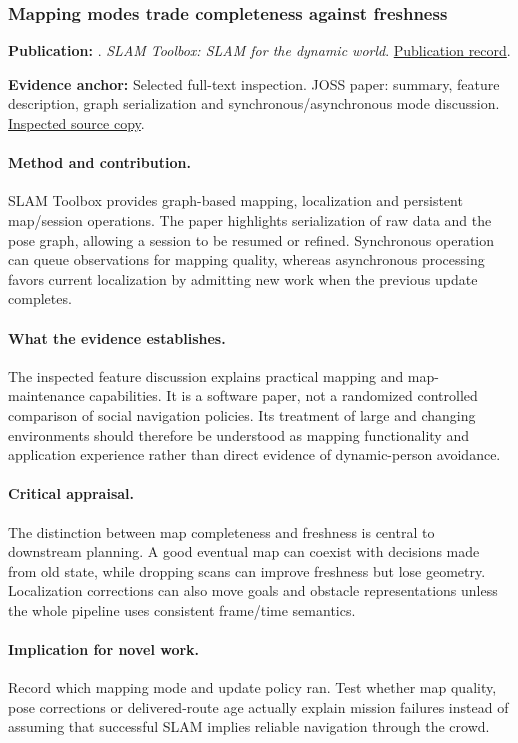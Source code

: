 \subsubsection{Mapping modes trade completeness against freshness}\label{paper:slam}
\textbf{Publication:} \citet{slam}. \emph{SLAM Toolbox: SLAM for the dynamic world}. \href{https://doi.org/10.21105/joss.02783}{Publication record}.

\textbf{Evidence anchor:} Selected full-text inspection. JOSS paper: summary, feature description, graph serialization and synchronous/asynchronous mode discussion. \href{https://www.theoj.org/joss-papers/joss.02783/10.21105.joss.02783.pdf}{Inspected source copy}.

\paragraph{Method and contribution.} SLAM Toolbox provides graph-based mapping, localization and persistent map/session operations. The paper highlights serialization of raw data and the pose graph, allowing a session to be resumed or refined. Synchronous operation can queue observations for mapping quality, whereas asynchronous processing favors current localization by admitting new work when the previous update completes.

\paragraph{What the evidence establishes.} The inspected feature discussion explains practical mapping and map-maintenance capabilities. It is a software paper, not a randomized controlled comparison of social navigation policies. Its treatment of large and changing environments should therefore be understood as mapping functionality and application experience rather than direct evidence of dynamic-person avoidance.

\paragraph{Critical appraisal.} The distinction between map completeness and freshness is central to downstream planning. A good eventual map can coexist with decisions made from old state, while dropping scans can improve freshness but lose geometry. Localization corrections can also move goals and obstacle representations unless the whole pipeline uses consistent frame/time semantics.

\paragraph{Implication for novel work.} Record which mapping mode and update policy ran. Test whether map quality, pose corrections or delivered-route age actually explain mission failures instead of assuming that successful SLAM implies reliable navigation through the crowd.
